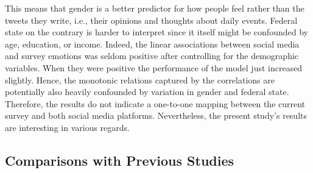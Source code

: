 \documentclass[
  english,
  jou,floatsintext]{apa7}
\begin{document}
This means that gender is a better predictor for how people feel rather than the tweets they write, i.e., their opinions and thoughts about daily events. Federal state on the contrary is harder to interpret since it itself might be confounded by age, education, or income.
Indeed, the linear associations between social media and survey emotions was seldom positive after controlling for the demographic variables. When they were positive the performance of the model just increased slightly. Hence, the monotonic relations captured by the correlations are potentially also heavily confounded by variation in gender and federal state.\\
Therefore, the results do not indicate a one-to-one mapping between the current survey and both social media platforms. Nevertheless, the present study's results are interesting in various regards.

\hypertarget{comparisons-with-previous-studies}{%
\subsection{Comparisons with Previous Studies}\label{comparisons-with-previous-studies}}
\end{document}
